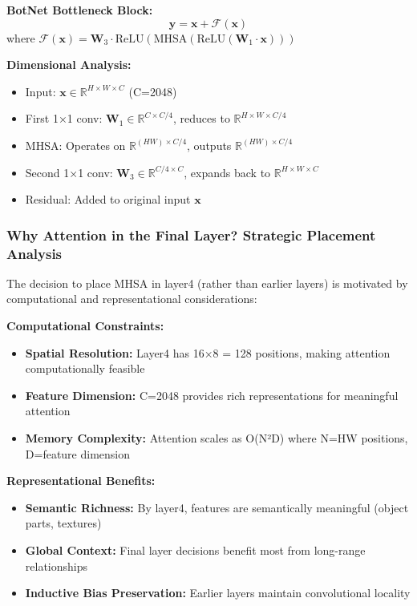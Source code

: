 \documentclass[a4paper,12pt]{article}
\begin{document}
\textbf{BotNet Bottleneck Block:}
\[
\mathbf{y} = \mathbf{x} + \mathcal{F}(\mathbf{x})
\]
where $\mathcal{F}(\mathbf{x}) = \mathbf{W}_3 \cdot \text{ReLU}(\text{MHSA}(\text{ReLU}(\mathbf{W}_1 \cdot \mathbf{x})))$

\textbf{Dimensional Analysis:}
\begin{itemize}
    \item Input: $\mathbf{x} \in \mathbb{R}^{H \times W \times C}$ (C=2048)
    \item First 1×1 conv: $\mathbf{W}_1 \in \mathbb{R}^{C \times C/4}$, reduces to $\mathbb{R}^{H \times W \times C/4}$
    \item MHSA: Operates on $\mathbb{R}^{(HW) \times C/4}$, outputs $\mathbb{R}^{(HW) \times C/4}$
    \item Second 1×1 conv: $\mathbf{W}_3 \in \mathbb{R}^{C/4 \times C}$, expands back to $\mathbb{R}^{H \times W \times C}$
    \item Residual: Added to original input $\mathbf{x}$
\end{itemize}

\subsubsection{Why Attention in the Final Layer? Strategic Placement Analysis}

The decision to place MHSA in layer4 (rather than earlier layers) is motivated by computational and representational considerations:

\textbf{Computational Constraints:}
\begin{itemize}
    \item \textbf{Spatial Resolution:} Layer4 has 16×8 = 128 positions, making attention computationally feasible
    \item \textbf{Feature Dimension:} C=2048 provides rich representations for meaningful attention
    \item \textbf{Memory Complexity:} Attention scales as O(N²D) where N=HW positions, D=feature dimension
\end{itemize}

\textbf{Representational Benefits:}
\begin{itemize}
    \item \textbf{Semantic Richness:} By layer4, features are semantically meaningful (object parts, textures)
    \item \textbf{Global Context:} Final layer decisions benefit most from long-range relationships
    \item \textbf{Inductive Bias Preservation:} Earlier layers maintain convolutional locality
\end{itemize}
\end{document}
